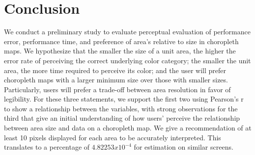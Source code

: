 \section{Conclusion} \label{sec:conclusion}
We conduct a preliminary study to evaluate perceptual evaluation of performance error, performance time, and preference of area's relative to size in choropleth maps. We hypothesize that the smaller the size of a unit area, the higher the error rate of perceiving the correct underlying color category; the smaller the unit area, the more time required to perceive its color; and the user will prefer choropleth maps with a larger minimum size over those with smaller sizes. Particularly, users will prefer a trade-off between area resolution in favor of legibility. For these three statements, we support the first two using Pearson's r to show a relationship between the variables, with strong observations for the third that give an initial understanding of how users' perceive the relationship between area size and data on a choropleth map. We give a recommendation of at least 10 pixels displayed for each area to be accurately interpreted. This translates to a percentage of $4.82253x10^{-4}$ for estimation on similar screens.


